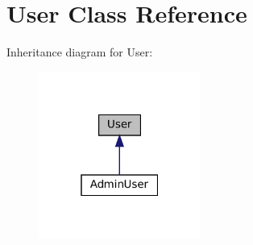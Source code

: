 \hypertarget{classUser}{}\section{User Class Reference}
\label{classUser}


Inheritance diagram for User\+:\nopagebreak
\begin{figure}[H]
\begin{center}
\leavevmode
\includegraphics[width=151pt]{classUser__inherit__graph}
\end{center}
\end{figure}
